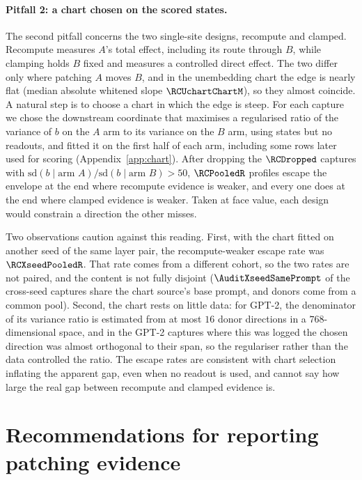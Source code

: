 \documentclass{article}
\theoremstyle{plain}
\theoremstyle{definition}
\begin{document}
\paragraph{Pitfall 2: a chart chosen on the scored states.} The second pitfall concerns the two single-site designs,
recompute and clamped. Recompute measures $A$'s total effect, including its route through $B$, while clamping holds $B$
fixed and measures a controlled direct effect. The two differ only where patching $A$ moves $B$, and in the unembedding
chart the edge is nearly flat (median absolute whitened slope $\RCUchartChartM$), so they almost coincide. A natural
step is to choose a chart in which the edge is steep. For each capture we chose the downstream coordinate that
maximises a regularised ratio of the variance of $b$ on the $A$ arm to its variance on the $B$ arm, using states but no
readouts, and fitted it on the first half of each arm, including some rows later used for scoring (Appendix~\ref{app:chart}). After dropping the
$\RCDropped$ captures with $\mathrm{sd}(b\mid\text{arm }A)/\mathrm{sd}(b\mid\text{arm }B)>50$, $\RCPooledR$ profiles
escape the envelope at the end where recompute evidence is weaker, and every one does at the end where clamped evidence
is weaker. Taken at face value, each design would constrain a direction the other misses.

Two observations caution against this reading. First, with the chart fitted on another seed of the same layer pair,
the recompute-weaker escape rate was $\RCXseedPooledR$. That rate comes from a different cohort, so the two rates are
not paired, and the content is not fully disjoint ($\AuditXseedSamePrompt$ of the cross-seed captures share the chart
source's base prompt, and donors come from a common pool). Second, the chart rests on little data: for GPT-2, the
denominator of its variance ratio is estimated from at most $16$ donor directions in a $768$-dimensional space, and in
the GPT-2 captures where this was logged the chosen direction was almost orthogonal to their span, so the regulariser
rather than the data controlled the ratio. The escape rates are consistent with chart selection inflating the apparent
gap, even when no readout is used, and cannot say how large the real gap between recompute and clamped evidence is.

\section{Recommendations for reporting patching evidence}
\label{sec:limitations}
\end{document}
